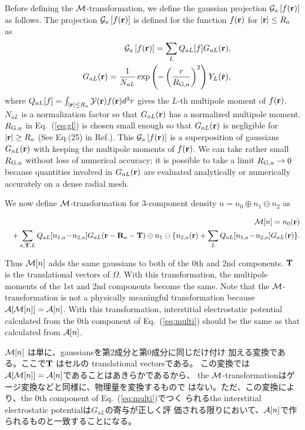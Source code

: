 \documentclass[twocolumn,showpacs,preprintnumbers,amsmath,amssymb,floatfix]{revtex4-1}
\newcommand{\bfr}{{\bf r}}
\newcommand{\bfT}{{\bf T}}
\newcommand{\bfR}{{\bf R}}
\newcommand{\YY}{{\cal Y}}
\newcommand{\GG}{{\cal G}}
\newcommand{\ooplus}{\oplus}
\newcommand{\oominus}{\ominus}
\def\calR{{\cal A}}
\newcommand{\req}[1]{\mbox{Eq.~\!(\ref{#1})}}
\def\RGSa{R_{{\rm G},a}}
\def\MM{{\cal M}}
\def\intaa{\int_{|\bfr|\leq R_a}}
\def\RGSa{R_{{\rm G},a}}
\def\MM{{\cal M}}
\def\intaa{\int_{|\bfr|\leq R_a}}
\begin{document}
Before defining the $\MM$-transformation, we define the gaussian
projection $\GG_a \left[f(\bfr)\right]$ as follows.  The projection
$\GG_a \left[f(\bfr)\right]$ is defined for the function $f(\bfr)$ for
$|\bfr|\leq R_a$ as
\begin{eqnarray}
&&\GG_a \left[f(\bfr)\right]
=\sum_L Q_{aL}[f] G_{aL}(\bfr), \label{eq:gdef} \\
&&G_{aL}(\bfr)= \frac{1}{N_{aL}} \exp\left(-\left(\frac{r}{\RGSa}\right)^2\right)
Y_L(\hat{\bfr}),\label{eq:gl}
\end{eqnarray}
where $Q_{aL}[f]=\intaa \YY(\bfr) f(\bfr) d^3r$
gives the $L$-th multipole moment of $f(\bfr)$.
$N_{aL}$ is a normalization factor
so that $G_{aL}(\bfr)$ has a normalized multipole moment.
$\RGSa$ in \req{eq:gl} is chosen small enough so that $G_{aL}(\bfr)$ is
negligible for $|\bfr|\geq R_a$ (See Eq.(25) in
Ref.\cite{lmfchap}). This $\GG_a \left[f(\bfr)\right]$ is a
superposition of gaussians $G_{aL}(\bfr)$ with keeping the multipole
moments of $f(\bfr)$.  We can take rather small $\RGSa$ without loss of
numerical accuracy; it is possible to take a limit $\RGSa \to 0$ because
quantities involved in $G_{aL}(\bfr)$ are evaluated analytically or
numerically accurately on a dense radial mesh.

We now define $\MM$-transformation for
3-component density $n= n_0 \ooplus n_1 \oominus n_2$ as
\begin{widetext}
\begin{eqnarray}
&&\MM[n]=  n_0(\bfr) \nonumber \\
&&+ \sum_{a,\bfT,L} Q_{aL}[n_{1,a}\!-\!n_{2,a}]G_{aL}(\bfr-\bfR_a-\bfT) 
\ooplus n_{1} \oominus 
\{n_{2,a}(\bfr) + \sum_L Q_{aL}[n_{1,a}\!-\!n_{2,a}]G_{aL}(\bfr) \}. \label{eq:multi}
\end{eqnarray}
\end{widetext}
Thus $\MM[n]$ adds the same gaussians to both of the 0th and 2nd
components.  $\bfT$ is the translational vectors of $\Omega$.  With this
transformation, the multipole moments of the 1st and 2nd components become
the same.  Note that the $\MM$-transformation is not a physically
meaningful transformation because $\calR[\MM[n]]=\calR[n]$.  With this
transformation, interstitial electrostatic potential calculated from the
0th component of \req{eq:multi} should be the same as that calculated
from $\calR[n]$.

$\MM[n]$ は単に、gaussiansを第2成分と第0成分に同じだけ付け
加える変換である。ここで$\bfT$ はセルの translational vectorsである。
この変換では$\calR[\MM[n]]=\calR[n]$であることはあきらかであるから、
the $\MM$-transformationはゲージ変換などと同様に、物理量を変換するもので
はない。ただ、この変換により、the 0th component of \req{eq:multi}でつく
られるthe interstitial electrostatic potentialは$G_{aL}$の寄与が正しく評
価される限りにおいて、$\calR[n]$で作られるものと一致することになる。
\end{document}
